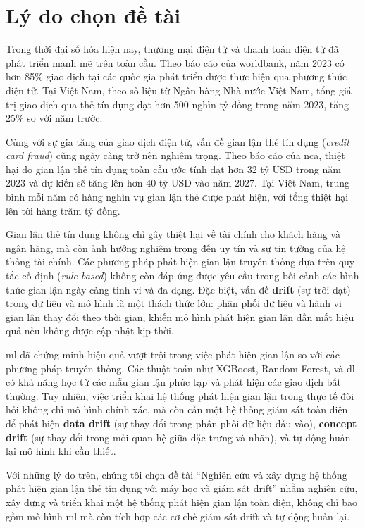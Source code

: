 \section{Lý do chọn đề tài}

Trong thời đại số hóa hiện nay, thương mại điện tử và thanh toán điện tử đã phát triển mạnh mẽ trên toàn cầu. Theo báo cáo của \ac{worldbank}, năm 2023 có hơn 85\% giao dịch tại các quốc gia phát triển được thực hiện qua phương thức điện tử. Tại Việt Nam, theo số liệu từ Ngân hàng Nhà nước Việt Nam, tổng giá trị giao dịch qua thẻ tín dụng đạt hơn 500 nghìn tỷ đồng trong năm 2023, tăng 25\% so với năm trước.

Cùng với sự gia tăng của giao dịch điện tử, vấn đề gian lận thẻ tín dụng (\textit{credit card fraud}) cũng ngày càng trở nên nghiêm trọng. Theo báo cáo của \ac{nca}, thiệt hại do gian lận thẻ tín dụng toàn cầu ước tính đạt hơn 32 tỷ USD trong năm 2023 và dự kiến sẽ tăng lên hơn 40 tỷ USD vào năm 2027. Tại Việt Nam, trung bình mỗi năm có hàng nghìn vụ gian lận thẻ được phát hiện, với tổng thiệt hại lên tới hàng trăm tỷ đồng.

Gian lận thẻ tín dụng không chỉ gây thiệt hại về tài chính cho khách hàng và ngân hàng, mà còn ảnh hưởng nghiêm trọng đến uy tín và sự tin tưởng của hệ thống tài chính. Các phương pháp phát hiện gian lận truyền thống dựa trên quy tắc cố định (\textit{rule-based}) không còn đáp ứng được yêu cầu trong bối cảnh các hình thức gian lận ngày càng tinh vi và đa dạng. Đặc biệt, vấn đề \textbf{drift} (sự trôi dạt) trong dữ liệu và mô hình là một thách thức lớn: phân phối dữ liệu và hành vi gian lận thay đổi theo thời gian, khiến mô hình phát hiện gian lận dần mất hiệu quả nếu không được cập nhật kịp thời.

\ac{ml} đã chứng minh hiệu quả vượt trội trong việc phát hiện gian lận so với các phương pháp truyền thống. Các thuật toán như XGBoost, Random Forest, và \ac{dl} có khả năng học từ các mẫu gian lận phức tạp và phát hiện các giao dịch bất thường. Tuy nhiên, việc triển khai hệ thống phát hiện gian lận trong thực tế đòi hỏi không chỉ mô hình chính xác, mà còn cần một hệ thống giám sát toàn diện để phát hiện \textbf{data drift} (sự thay đổi trong phân phối dữ liệu đầu vào), \textbf{concept drift} (sự thay đổi trong mối quan hệ giữa đặc trưng và nhãn), và tự động huấn lại mô hình khi cần thiết.

Với những lý do trên, chúng tôi chọn đề tài ``Nghiên cứu và xây dựng hệ thống phát hiện gian lận thẻ tín dụng với máy học và giám sát drift'' nhằm nghiên cứu, xây dựng và triển khai một hệ thống phát hiện gian lận toàn diện, không chỉ bao gồm mô hình \ac{ml} mà còn tích hợp các cơ chế giám sát drift và tự động huấn lại.

